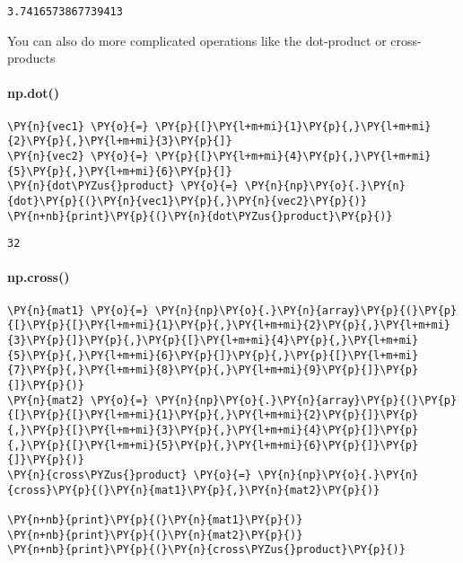     \begin{Verbatim}[commandchars=\\\{\}]
3.7416573867739413
    \end{Verbatim}

    You can also do more complicated operations like the dot-product or
cross-products

\hypertarget{np.dot}{%
\paragraph{np.dot()}\label{np.dot}}

    \begin{tcolorbox}[breakable, size=fbox, boxrule=1pt, pad at break*=1mm,colback=cellbackground, colframe=cellborder]
\begin{Verbatim}[commandchars=\\\{\}]
\PY{n}{vec1} \PY{o}{=} \PY{p}{[}\PY{l+m+mi}{1}\PY{p}{,}\PY{l+m+mi}{2}\PY{p}{,}\PY{l+m+mi}{3}\PY{p}{]}
\PY{n}{vec2} \PY{o}{=} \PY{p}{[}\PY{l+m+mi}{4}\PY{p}{,}\PY{l+m+mi}{5}\PY{p}{,}\PY{l+m+mi}{6}\PY{p}{]}
\PY{n}{dot\PYZus{}product} \PY{o}{=} \PY{n}{np}\PY{o}{.}\PY{n}{dot}\PY{p}{(}\PY{n}{vec1}\PY{p}{,}\PY{n}{vec2}\PY{p}{)}
\PY{n+nb}{print}\PY{p}{(}\PY{n}{dot\PYZus{}product}\PY{p}{)}
\end{Verbatim}
\end{tcolorbox}

    \begin{Verbatim}[commandchars=\\\{\}]
32
    \end{Verbatim}

    \hypertarget{np.cross}{%
\paragraph{np.cross()}\label{np.cross}}

    \begin{tcolorbox}[breakable, size=fbox, boxrule=1pt, pad at break*=1mm,colback=cellbackground, colframe=cellborder]
\begin{Verbatim}[commandchars=\\\{\}]
\PY{n}{mat1} \PY{o}{=} \PY{n}{np}\PY{o}{.}\PY{n}{array}\PY{p}{(}\PY{p}{[}\PY{p}{[}\PY{l+m+mi}{1}\PY{p}{,}\PY{l+m+mi}{2}\PY{p}{,}\PY{l+m+mi}{3}\PY{p}{]}\PY{p}{,}\PY{p}{[}\PY{l+m+mi}{4}\PY{p}{,}\PY{l+m+mi}{5}\PY{p}{,}\PY{l+m+mi}{6}\PY{p}{]}\PY{p}{,}\PY{p}{[}\PY{l+m+mi}{7}\PY{p}{,}\PY{l+m+mi}{8}\PY{p}{,}\PY{l+m+mi}{9}\PY{p}{]}\PY{p}{]}\PY{p}{)}
\PY{n}{mat2} \PY{o}{=} \PY{n}{np}\PY{o}{.}\PY{n}{array}\PY{p}{(}\PY{p}{[}\PY{p}{[}\PY{l+m+mi}{1}\PY{p}{,}\PY{l+m+mi}{2}\PY{p}{]}\PY{p}{,}\PY{p}{[}\PY{l+m+mi}{3}\PY{p}{,}\PY{l+m+mi}{4}\PY{p}{]}\PY{p}{,}\PY{p}{[}\PY{l+m+mi}{5}\PY{p}{,}\PY{l+m+mi}{6}\PY{p}{]}\PY{p}{]}\PY{p}{)}
\PY{n}{cross\PYZus{}product} \PY{o}{=} \PY{n}{np}\PY{o}{.}\PY{n}{cross}\PY{p}{(}\PY{n}{mat1}\PY{p}{,}\PY{n}{mat2}\PY{p}{)}

\PY{n+nb}{print}\PY{p}{(}\PY{n}{mat1}\PY{p}{)}
\PY{n+nb}{print}\PY{p}{(}\PY{n}{mat2}\PY{p}{)}
\PY{n+nb}{print}\PY{p}{(}\PY{n}{cross\PYZus{}product}\PY{p}{)}
\end{Verbatim}
\end{tcolorbox}

